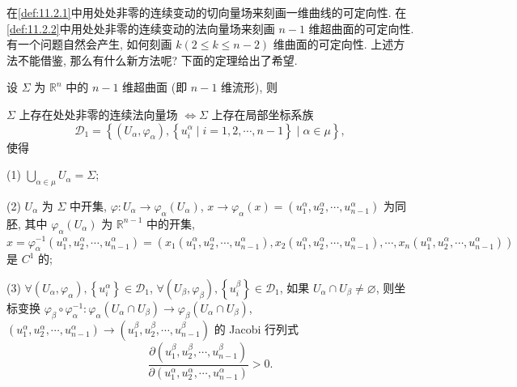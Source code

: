 \begin{remark}\label{rem:11.2.2}
在\cref{def:11.2.1}中用处处非零的连续变动的切向量场来刻画一维曲线的可定向性. 在\cref{def:11.2.2}中用处处非零的连续变动的法向量场来刻画 $n-1$ 维超曲面的可定向性. 有一个问题自然会产生, 如何刻画 $k(2 \leqslant k \leqslant n-2)$ 维曲面的可定向性. 上述方法不能借鉴, 那么有什么新方法呢? 下面的定理给出了希望.
\end{remark}

\begin{theorem}\label{thm:11.2.1}
设 $\Sigma$ 为 $\mathbb{R}^{n}$ 中的 $n-1$ 维超曲面 (即 $n-1$ 维流形), 则

$\Sigma$ 上存在处处非零的连续法向量场 $\Leftrightarrow \Sigma$ 上存在局部坐标系族
\[
  \mathcal{D}_{1}=\left\{\left(U_{\alpha}, \varphi_{\alpha}\right),\left\{u_{i}^{\alpha} \mid i=1,2, \cdots, n-1\right\} \mid \alpha \in \mu\right\},
\]
使得

(1) $\bigcup\limits_{\alpha \in \mu} U_{\alpha}=\Sigma$;

(2) $U_{\alpha}$ 为 $\Sigma$ 中开集, $\varphi: U_{\alpha} \to \varphi_{\alpha}\left(U_{\alpha}\right)$, $x \to \varphi_{\alpha}(x)=(u_{1}^{\alpha}, \allowbreak u_{2}^{\alpha}, \allowbreak \cdots, \allowbreak u_{n-1}^{\alpha})$ 为同胚, 其中 $\varphi_{\alpha}\left(U_{\alpha}\right)$ 为 $\mathbb{R}^{n-1}$ 中的开集, $x=\varphi_{\alpha}^{-1}(u_{1}^{\alpha}, \allowbreak u_{2}^{\alpha}, \allowbreak \cdots, \allowbreak u_{n-1}^{\alpha})=(x_{1}(u_{1}^{\alpha}, \allowbreak u_{2}^{\alpha}, \allowbreak \cdots, \allowbreak u_{n-1}^{\alpha}), \allowbreak x_{2}(u_{1}^{\alpha}, \allowbreak u_{2}^{\alpha}, \allowbreak \cdots, \allowbreak u_{n-1}^{\alpha}), \allowbreak \cdots, \allowbreak x_{n}(u_{1}^{\alpha}, \allowbreak u_{2}^{\alpha}, \allowbreak \cdots, \allowbreak u_{n-1}^{\alpha}))$ 是 $C^{1}$ 的;

(3) $\forall\left(U_{\alpha}, \varphi_{\alpha}\right),\left\{u_{i}^{\alpha}\right\} \in \mathcal{D}_{1}$, $\forall\left(U_{\beta}, \varphi_{\beta}\right),\left\{u_{i}^{\beta}\right\} \in \mathcal{D}_{1}$, 如果 $U_{\alpha} \cap U_{\beta} \neq \varnothing$, 则坐标变换 $\varphi_{\beta} \circ \varphi_{\alpha}^{-1}: \varphi_{\alpha}\left(U_{\alpha} \cap U_{\beta}\right) \to \varphi_{\beta}\left(U_{\alpha} \cap U_{\beta}\right)$, $\left(u_{1}^{\alpha}, u_{2}^{\alpha}, \cdots, u_{n-1}^{\alpha}\right) \to\left(u_{1}^{\beta}, u_{2}^{\beta}, \cdots, u_{n-1}^{\beta}\right)$ 的 Jacobi 行列式
\[
  \frac{\partial\left(u_{1}^{\beta}, u_{2}^{\beta}, \cdots, u_{n-1}^{\beta}\right)}{\partial\left(u_{1}^{\alpha}, u_{2}^{\alpha}, \cdots, u_{n-1}^{\alpha}\right)}>0.
\]
\end{theorem}

